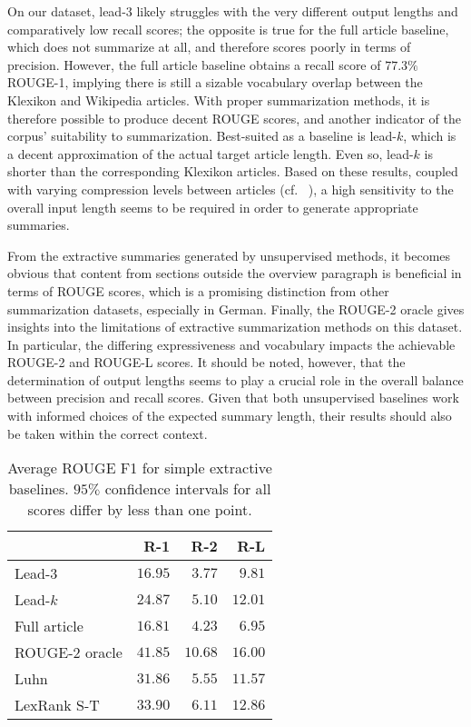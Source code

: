 \documentclass[10pt, a4paper]{article}
\begin{document}
On our dataset, lead-$3$ likely struggles with the very different output lengths and comparatively low recall scores; the opposite is true for the full article baseline, which does not summarize at all, and therefore scores poorly in terms of precision.
However, the full article baseline obtains a recall score of $77.3\%$ ROUGE-1, implying there is still a sizable vocabulary overlap between the Klexikon and Wikipedia articles.
With proper summarization methods, it is therefore possible to produce decent ROUGE scores, and another indicator of the corpus' suitability to summarization.
Best-suited as a baseline is lead-$k$, which is a decent approximation of the actual target article length. Even so, lead-$k$ is shorter than the corresponding Klexikon articles.
Based on these results, coupled with varying compression levels  between articles (cf. ~), a high sensitivity to the overall input length seems to be required in order to generate appropriate summaries.

From the extractive summaries generated by unsupervised methods, it becomes obvious that content from sections outside the overview paragraph is beneficial in terms of ROUGE scores, which is a promising distinction from other summarization datasets, especially in German.
Finally, the ROUGE-2 oracle gives insights into the limitations of extractive summarization methods on this dataset. In particular, the differing expressiveness and vocabulary impacts the achievable ROUGE-2 and ROUGE-L scores. It should be noted, however, that the determination of output lengths seems to play a crucial role in the overall balance between precision and recall scores. Given that both unsupervised baselines work with informed choices of the expected summary length, their results should also be taken within the correct context.

\begin{table}
	\centering
	\begin{tabular}{lr|r|r}
		\hline
		\textbf{} & \textbf{R-1} & \textbf{R-2} & \textbf{R-L}\\
		\hline
		Lead-$3$ & $16.95$ & $3.77$ & $9.81$ \\
		Lead-$k$ & $24.87$ & $5.10$ & $12.01$ \\
		Full article & $16.81$ & $4.23$ & $6.95$ \\
		\hline
		ROUGE-2 oracle & $41.85$ & $10.68$ & $16.00$ \\
		\hline
		Luhn & $31.86$ & $5.55$ & $11.57$ \\
		LexRank S-T & $33.90$ & $6.11$ & $12.86$ \\
		
	\end{tabular}
	\caption{Average ROUGE F1 for simple extractive baselines. $95\%$ confidence intervals for all scores differ by less than one point.}
	\label{tab:rouge}
\end{table}
\end{document}

